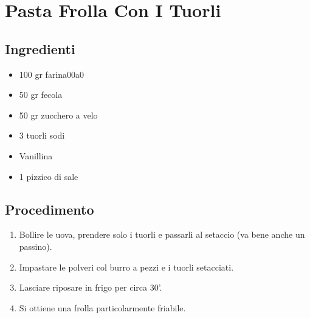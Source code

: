 \section{Pasta Frolla Con I Tuorli}
\subsection{Ingredienti}
\begin{itemize}
\item 100 gr farina00a0   
\item 50 gr fecola  
\item 50 gr zucchero a velo  
\item 3 tuorli sodi  
\item Vanillina  
\item 1 pizzico di sale
\end{itemize}
\subsection{Procedimento}
\begin{enumerate}
\item  Bollire le uova, prendere solo i tuorli e passarli al setaccio (va bene anche un passino).  
\item  Impastare le polveri col burro a pezzi e i tuorli setacciati.  
\item  Lasciare riposare in frigo per circa 30'.  
\item  Si ottiene una frolla particolarmente friabile.
\end{enumerate}
